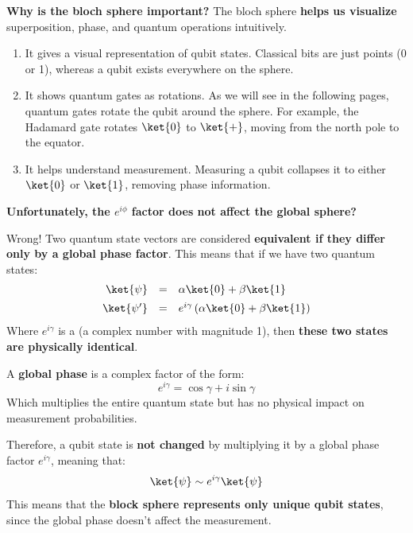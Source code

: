\highspace
\textcolor{Green3}{ \textbf{Why is the bloch sphere important?}}
The bloch sphere \textbf{helps us visualize} superposition, phase, and quantum operations intuitively.
\begin{enumerate}
    \item It gives a visual representation of qubit states. Classical bits are just points (0 or 1), whereas a qubit exists everywhere on the sphere.
    
    \item It shows quantum gates as rotations. As we will see in the following pages, quantum gates rotate the qubit around the sphere. For example, the Hadamard gate rotates $\ket{0}$ to $\ket{+}$, moving from the north pole to the equator.

    \item It helps understand measurement. Measuring a qubit collapses it to either $\ket{0}$ or $\ket{1}$, removing phase information.
\end{enumerate}

\highspace
\begin{flushleft}
    \textcolor{Green3}{ \textbf{Unfortunately, the $e^{i\phi}$ factor does not affect the global sphere?}}
\end{flushleft}
Wrong! Two quantum state vectors are considered \textbf{equivalent if they differ only by a global phase factor}. This means that if we have two quantum states:  
\begin{equation*}
    \begin{array}{rcl}
        \ket{\psi}  &=& \alpha\ket{0} + \beta\ket{1} \\[.5em]
        \ket{\psi'} &=& e^{i\gamma}\left(\alpha\ket{0} + \beta\ket{1}\right)
    \end{array}
\end{equation*}
Where $e^{i\gamma}$ is a  (a complex number with magnitude 1), then \textbf{these two states are physically identical}.

\highspace
A \textbf{global phase} is a complex factor of the form:
\begin{equation*}
    e^{i\gamma} = \cos\gamma + i\sin\gamma
\end{equation*}
Which multiplies the entire quantum state but has no physical impact on measurement probabilities.

\highspace
Therefore, a qubit state is \textbf{not changed} by multiplying it by a global phase factor $e^{i\gamma}$, meaning that:
\begin{equation*}
    \ket{\psi} \sim e^{i \gamma} \ket{\psi}
\end{equation*}
This means that the \textbf{block sphere represents only unique qubit states}, since the global phase doesn't affect the measurement.

